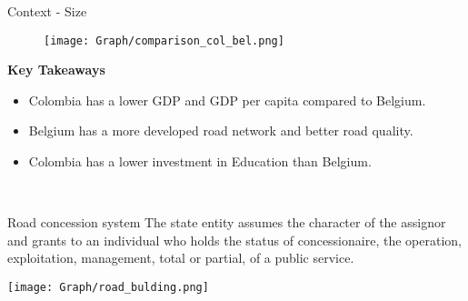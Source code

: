 \documentclass[9pt]{beamer}
\begin{document}
\begin{frame}{Context - Size } \label{map_comp}

\begin{figure} [h!]
    \centering
    \renewcommand\thefigure{4.1}
     \texttt{[image: Graph/comparison\_col\_bel.png]}
\end{figure}
  \textbf{Key Takeaways}
  \begin{itemize}
    \item Colombia has a lower GDP and GDP per capita compared to Belgium.
    \item Belgium has a more developed road network and better road quality.
    \item Colombia has a lower investment in Education than Belgium.
  \end{itemize}\\
\hyperlink{comparison}{}
  
\end{frame}

\begin{frame}{Road concession system } \label{roads1} 
\justifying
The state entity assumes the character of the assignor and grants to an individual who holds the status of concessionaire, the operation, exploitation, management, total or partial, of a public service.

\centering\texttt{[image: Graph/road\_bulding.png]}


\hyperlink{general_context}{}

\end{frame}
\end{document}
